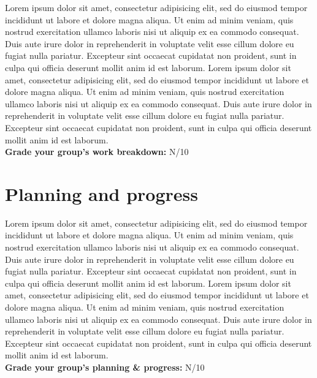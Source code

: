 \documentclass[10pt,a4paper]{article}
\begin{document}
\begin{framed}
Lorem ipsum dolor sit amet, consectetur adipisicing elit, sed do eiusmod tempor incididunt ut labore et dolore magna aliqua. Ut enim ad minim veniam, quis nostrud exercitation ullamco laboris nisi ut aliquip ex ea commodo consequat. Duis aute irure dolor in reprehenderit in voluptate velit esse cillum dolore eu fugiat nulla pariatur. Excepteur sint occaecat cupidatat non proident, sunt in culpa qui officia deserunt mollit anim id est laborum.
Lorem ipsum dolor sit amet, consectetur adipisicing elit, sed do eiusmod tempor incididunt ut labore et dolore magna aliqua. Ut enim ad minim veniam, quis nostrud exercitation ullamco laboris nisi ut aliquip ex ea commodo consequat. Duis aute irure dolor in reprehenderit in voluptate velit esse cillum dolore eu fugiat nulla pariatur. Excepteur sint occaecat cupidatat non proident, sunt in culpa qui officia deserunt mollit anim id est laborum.\\

\textbf{Grade your group's work breakdown:} N/10
\end{framed}


\section*{Planning and progress}
\begin{framed}
Lorem ipsum dolor sit amet, consectetur adipisicing elit, sed do eiusmod tempor incididunt ut labore et dolore magna aliqua. Ut enim ad minim veniam, quis nostrud exercitation ullamco laboris nisi ut aliquip ex ea commodo consequat. Duis aute irure dolor in reprehenderit in voluptate velit esse cillum dolore eu fugiat nulla pariatur. Excepteur sint occaecat cupidatat non proident, sunt in culpa qui officia deserunt mollit anim id est laborum.
Lorem ipsum dolor sit amet, consectetur adipisicing elit, sed do eiusmod tempor incididunt ut labore et dolore magna aliqua. Ut enim ad minim veniam, quis nostrud exercitation ullamco laboris nisi ut aliquip ex ea commodo consequat. Duis aute irure dolor in reprehenderit in voluptate velit esse cillum dolore eu fugiat nulla pariatur. Excepteur sint occaecat cupidatat non proident, sunt in culpa qui officia deserunt mollit anim id est laborum.\\

\textbf{Grade your group’s planning \& progress:} N/10
\end{framed}
\end{document}
